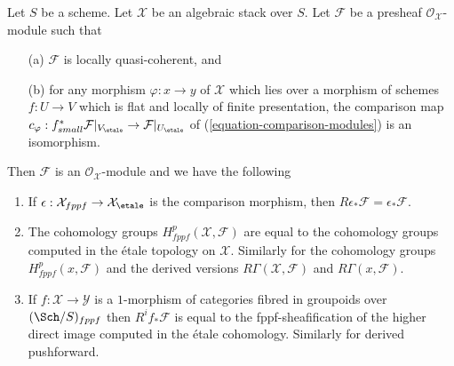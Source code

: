 \begin{lemma}
\label{lemma-compare-fppf-etale}
Let $S$ be a scheme. Let $\mathcal{X}$ be an algebraic stack over $S$.
Let $\mathcal{F}$ be a presheaf $\mathcal{O}_\mathcal{X}$-module such that
\begin{enumerate}
\item[(a)] $\mathcal{F}$ is locally quasi-coherent, and
\item[(b)] for any morphism $\varphi : x \to y$ of $\mathcal{X}$ which lies
over a morphism of schemes $f : U \to V$ which is flat and
locally of finite presentation, the comparison map
$c_\varphi : f_{small}^*\mathcal{F}|_{V_\etale} \to
\mathcal{F}|_{U_\etale}$ of
(\ref{equation-comparison-modules}) is an isomorphism.
\end{enumerate}
Then $\mathcal{F}$ is an $\mathcal{O}_\mathcal{X}$-module and
we have the following
\begin{enumerate}
\item If $\epsilon : \mathcal{X}_{fppf} \to \mathcal{X}_\etale$
is the comparison morphism, then
$R\epsilon_*\mathcal{F} = \epsilon_*\mathcal{F}$.
\item The cohomology groups $H^p_{fppf}(\mathcal{X}, \mathcal{F})$ are equal
to the cohomology groups computed in the \'etale topology on $\mathcal{X}$.
Similarly for the cohomology groups $H^p_{fppf}(x, \mathcal{F})$ and the
derived versions $R\Gamma(\mathcal{X}, \mathcal{F})$ and
$R\Gamma(x, \mathcal{F})$.
\item If $f : \mathcal{X} \to \mathcal{Y}$ is a $1$-morphism of
categories fibred in groupoids over $(\Sch/S)_{fppf}$ then
$R^if_*\mathcal{F}$ is equal to the fppf-sheafification of the
higher direct image computed in the \'etale cohomology.
Similarly for derived pushforward.
\end{enumerate}
\end{lemma}

